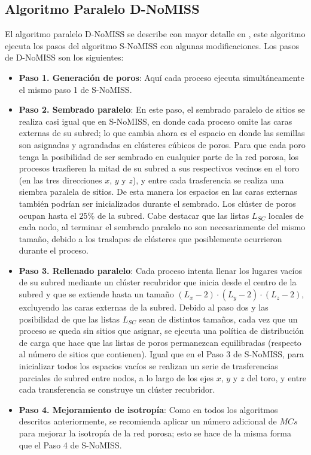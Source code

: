 \subsection{Algoritmo Paralelo D-NoMISS}
\label{subsubsec:pd-nomiss}
El algoritmo paralelo D-NoMISS se describe con mayor detalle en \cite{ref4}, este algoritmo ejecuta los pasos del algoritmo S-NoMISS 
con algunas modificaciones. Los pasos de D-NoMISS son los siguientes:

\begin{itemize}
\item[] \textbf{Paso 1. Generación de poros}: Aquí cada proceso ejecuta simultáneamente el mismo paso 1 de S-NoMISS.

\item[] \textbf{Paso 2. Sembrado paralelo}: En este paso, el sembrado paralelo de sitios se realiza casi igual que en S-NoMISS, en donde
cada proceso omite las caras externas de su subred; lo que cambia ahora es el espacio en donde las semillas son asignadas y agrandadas en
clústeres cúbicos de poros. Para que cada poro tenga la
posibilidad de ser sembrado en cualquier parte de la red porosa, los procesos trasfieren la mitad de su subred a sus respectivos vecinos 
en el toro (en las tres direcciones $x$, $y$ y $z$), y entre cada trasferencia se realiza una siembra paralela de sitios. De esta manera 
los espacios en las caras externas también podrían ser inicializados durante el sembrado.
Los clúster de poros ocupan hasta el $25\%$ de la subred. Cabe destacar que las listas $L_{SC}$ locales de cada nodo, al terminar el
sembrado paralelo no son necesariamente del mismo tamaño, debido a los traslapes de clústeres que posiblemente ocurrieron durante el proceso.

\item[] \textbf{Paso 3. Rellenado paralelo}: Cada proceso intenta llenar los lugares vacíos de su subred mediante un clúster recubridor que 
inicia desde el centro de la subred y que se 
extiende hasta un tamaño $(L_x -2) \cdot (L_y - 2) \cdot (L_z -2)$, excluyendo las caras externas de la subred. Debido al paso dos y 
las posibilidad de que las listas $L_{SC}$ sean de distintos tamaños, cada vez que un proceso se queda sin sitios que asignar, se 
ejecuta una política de distribución de carga que hace que las listas de poros permanezcan equilibradas (respecto al número de sitios que  contienen). Igual que en el Paso 3 de S-NoMISS, para inicializar todos los espacios vacíos se realizan un serie de trasferencias parciales de  subred entre nodos, a lo largo de los ejes $x$, $y$ y $z$ del toro, y entre cada transferencia se construye un clúster recubridor.

\item[] \textbf{Paso 4. Mejoramiento de isotropía}: Como en todos los algoritmos descritos anteriormente, se recomienda aplicar un 
número adicional de $MCs$ para mejorar la isotropía de la red porosa; esto se hace de la misma forma que el Paso 4 de S-NoMISS.\\
\end{itemize}

